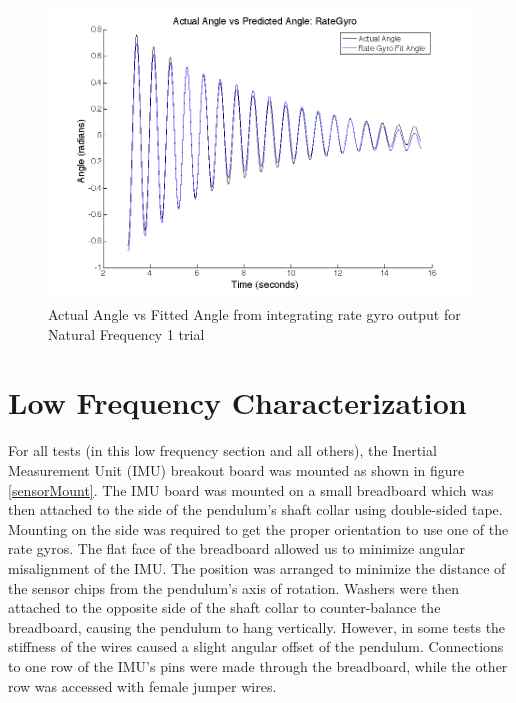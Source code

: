 \documentclass{article}
\theoremstyle{plain}
\theoremstyle{definition}
\theoremstyle{remark}
\begin{document}
\begin{figure}
\begin{center}
\includegraphics[width = 13cm]{rateGyroCalibResultsS8_636380.png}
\caption{Actual Angle vs Fitted Angle from integrating rate gyro output for Natural Frequency 1 trial}
\label{gyroCalib}
\end{center}
\end{figure}

\clearpage
\section{Low Frequency Characterization}

For all tests (in this low frequency section and all others), the Inertial Measurement Unit (IMU) breakout board was mounted as shown in figure \ref{sensorMount}. The IMU board was mounted on a small breadboard which was then attached to the side of the pendulum's shaft collar using double-sided tape. Mounting on the side was required to get the proper orientation to use one of the rate gyros. The flat face of the breadboard allowed us to minimize angular misalignment of the IMU. The position was arranged to minimize the distance of the sensor chips from the pendulum's axis of rotation. Washers were then attached to the opposite side of the shaft collar to counter-balance the breadboard, causing the pendulum to hang vertically. However, in some tests the stiffness of the wires caused a slight angular offset of the pendulum. Connections to one row of the IMU's pins were made through the breadboard, while the other row was accessed with female jumper wires.\\ 
\end{document}

